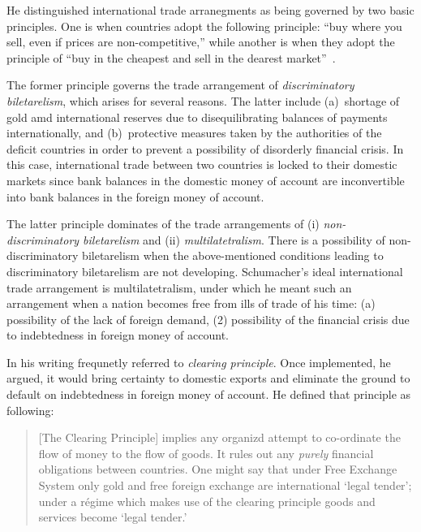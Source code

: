 He distinguished international trade arranegments as being governed by two basic principles. One is when countries adopt the following principle: ``buy where you sell, even if prices are non-competitive,'' while another is when they adopt the principle of ``buy in the cheapest and sell in the dearest market''~\citep[p.~237]{schumacher1942}. 

The former principle governs the trade arrangement of \textit{discriminatory biletarelism}, which arises for several reasons. The latter include (a)~shortage of gold amd international reserves due to disequilibrating balances of payments internationally, and (b)~protective measures taken by the authorities of the deficit countries in order to prevent a possibility of disorderly financial crisis. In this case, international trade between two countries is locked to their domestic markets since bank balances in the domestic money of account are inconvertible into bank balances in the foreign money of account. 

The latter principle dominates of the trade arrangements of (i) \textit{non-discriminatory biletarelism} and (ii) \textit{multilatetralism}. There is a possibility of non-discriminatory biletarelism when the above-mentioned conditions leading to discriminatory biletarelism are not developing. Schumacher's ideal international trade arrangement is multilatetralism, under which he meant such an arrangement when a nation becomes free from ills of trade of his time: (a) possibility of the lack of foreign demand, (2) possibility of the financial crisis due to indebtedness in foreign money of account.    

In his writing \cite{schumacher1942,schumacher1943} frequnetly referred to \textit{clearing principle}. Once implemented, he argued, it would bring certainty to domestic exports and eliminate the ground to default on indebtedness in foreign money of account. He defined that principle as following:

\begin{quote}
[The Clearing Principle] implies any organizd attempt to co-ordinate the flow of money to the flow of goods. It rules out any \textit{purely} financial obligations between countries. One might say that under Free Exchange System only gold and free foreign exchange are international `legal tender'; under a r{\'e}gime which makes use of the clearing principle goods and services become `legal tender.'~\cite[p.~248, footnote 6]{schumacher1942}
\end{quote}

